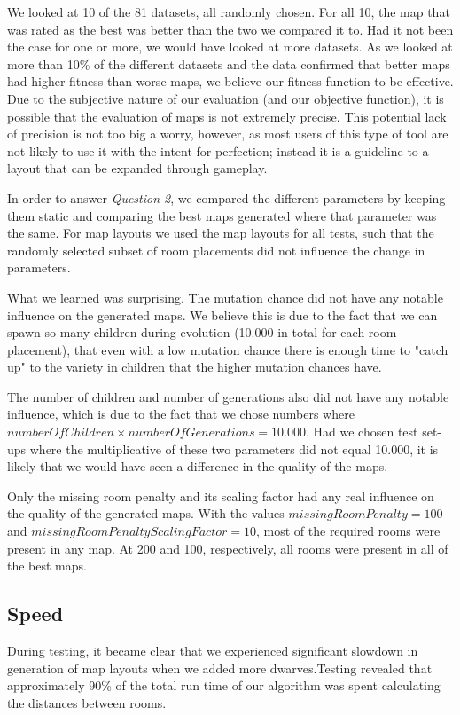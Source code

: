 We looked at 10 of the 81 datasets, all randomly chosen. For all 10, the map that was rated as the best was better than the two we compared it to. Had it not been the case for one or more, we would have looked at more datasets. As we looked at more than 10\% of the different datasets and the data confirmed that better maps had higher fitness than worse maps, we believe our fitness function to be effective. Due to the subjective nature of our evaluation (and our objective function), it is possible that the evaluation of maps is not extremely precise. This potential lack of precision is not too big a worry, however, as most users of this type of tool are not likely to use it with the intent for perfection; instead it is a guideline to a layout that can be expanded through gameplay.

In order to answer \textit{Question 2}, we compared the different parameters by keeping them static and comparing the best maps generated where that parameter was the same. For map layouts we used the map layouts for all tests, such that the randomly selected subset of room placements did not influence the change in parameters.

What we learned was surprising. The mutation chance did not have any notable influence on the generated maps. We believe this is due to the fact that we can spawn so many children during evolution (10.000 in total for each room placement), that even with a low mutation chance there is enough time to "catch up" to the variety in children that the higher mutation chances have.

The number of children and number of generations also did not have any notable influence, which is due to the fact that we chose numbers where $numberOfChildren \times numberOfGenerations = 10.000$. Had we chosen test set-ups where the multiplicative of these two parameters did not equal 10.000, it is likely that we would have seen a difference in the quality of the maps.

Only the missing room penalty and its scaling factor had any real influence on the quality of the generated maps. With the values $missingRoomPenalty = 100$ and $missingRoomPenaltyScalingFactor = 10$, most of the required rooms were present in any map. At 200 and 100, respectively, all rooms were present in all of the best maps.

\subsection{Speed}
During testing, it became clear that we experienced significant slowdown in generation of map layouts when we added more dwarves.Testing revealed that approximately 90\% of the total run time of our algorithm was spent calculating the distances between rooms.



